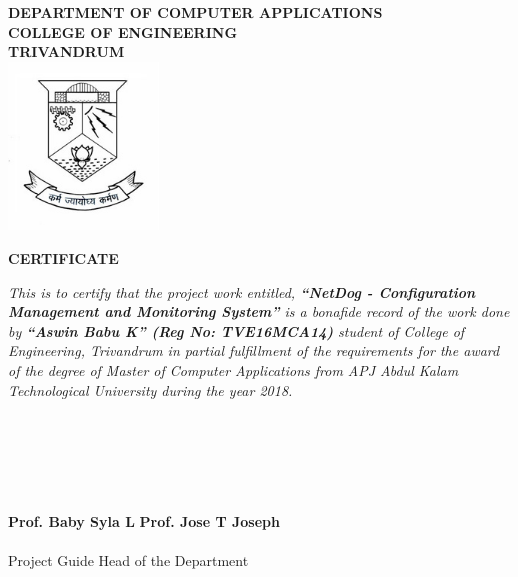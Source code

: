 \begin{titlepage}
\begin{center}

\textbf{DEPARTMENT OF COMPUTER APPLICATIONS}\\[0.5cm]
\textbf{ COLLEGE OF ENGINEERING \\ TRIVANDRUM}\\
[0.5cm]

\vspace{1.2cm}
\includegraphics[width=0.30\textwidth]{2.jpg}\\
\vspace{0.8cm}

\textbf{CERTIFICATE}\\
\end{center}

\textit{
This is to certify that the project work entitled,
\textbf{``NetDog - Configuration Management and Monitoring System''} is a
bonafide record of the work done by \textbf{``Aswin Babu K''
(Reg No: TVE16MCA14)} student of College of Engineering, Trivandrum in partial
fulfillment of the requirements for the award of the degree of Master of
Computer Applications from APJ Abdul Kalam Technological University during the
year 2018.}\\ \\ \\ \\ \\ \\

\vspace{3 cm}

\noindent\textbf{Prof. Baby Syla L}
\hfill \textbf{Prof. Jose T Joseph}
\\ \\
\noindent
Project Guide
\hfill Head of the Department

\end{titlepage}
